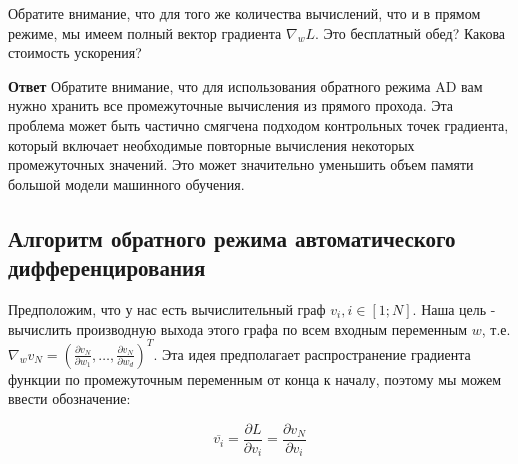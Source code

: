 \documentclass[
  russian,
  letterpaper,
  DIV=11,
  numbers=noendperiod]{scrartcl}
\begin{document}
\begin{tcolorbox}[enhanced jigsaw, colbacktitle=quarto-callout-color!10!white, toptitle=1mm, bottomrule=.15mm, left=2mm, opacitybacktitle=0.6, colframe=quarto-callout-color-frame, arc=.35mm, bottomtitle=1mm, colback=white, coltitle=black, title=\textcolor{quarto-callout-color}{\faInfo}\hspace{0.5em}{Question}, leftrule=.75mm, opacityback=0, rightrule=.15mm, toprule=.15mm, breakable, titlerule=0mm]

Обратите внимание, что для того же количества вычислений, что и в прямом
режиме, мы имеем полный вектор градиента \(\nabla_w L\). Это бесплатный
обед? Какова стоимость ускорения?

\textbf{Ответ} Обратите внимание, что для использования обратного режима
AD вам нужно хранить все промежуточные вычисления из прямого прохода.
Эта проблема может быть частично смягчена подходом контрольных точек
градиента, который включает необходимые повторные вычисления некоторых
промежуточных значений. Это может значительно уменьшить объем памяти
большой модели машинного обучения.

\end{tcolorbox}

\subsection{Алгоритм обратного режима автоматического
дифференцирования}\label{ux430ux43bux433ux43eux440ux438ux442ux43c-ux43eux431ux440ux430ux442ux43dux43eux433ux43e-ux440ux435ux436ux438ux43cux430-ux430ux432ux442ux43eux43cux430ux442ux438ux447ux435ux441ux43aux43eux433ux43e-ux434ux438ux444ux444ux435ux440ux435ux43dux446ux438ux440ux43eux432ux430ux43dux438ux44f}

Предположим, что у нас есть вычислительный граф \(v_i, i \in [1; N]\).
Наша цель - вычислить производную выхода этого графа по всем входным
переменным \(w\), т.е.
\(\nabla_w v_N =  \left( \frac{\partial v_N}{\partial w_1}, \ldots, \frac{\partial v_N}{\partial w_d}\right)^T\).
Эта идея предполагает распространение градиента функции по промежуточным
переменным от конца к началу, поэтому мы можем ввести обозначение:

\[
\overline{v_i}  = \dfrac{\partial L}{\partial v_i} = \dfrac{\partial v_N}{\partial v_i}
\]
\end{document}
